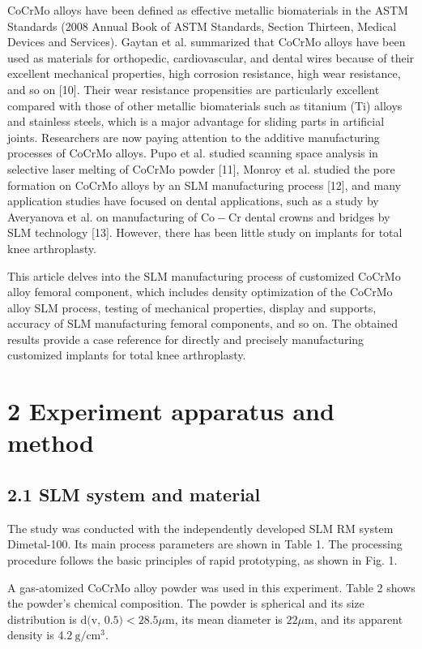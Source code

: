 \documentclass[10pt]{article}
\begin{document}
CoCrMo alloys have been defined as effective metallic biomaterials in the ASTM Standards (2008 Annual Book of ASTM Standards, Section Thirteen, Medical Devices and Services). Gaytan et al. summarized that CoCrMo alloys have been used as materials for orthopedic, cardiovascular, and dental wires because of their excellent mechanical properties, high corrosion resistance, high wear resistance, and so on [10]. Their wear resistance propensities are particularly excellent compared with those of other metallic biomaterials such as titanium (Ti) alloys and stainless steels, which is a major advantage for sliding parts in artificial joints. Researchers are now paying attention to the additive manufacturing processes of CoCrMo alloys. Pupo et al. studied scanning space analysis in selective laser melting of CoCrMo powder [11], Monroy et al. studied the pore formation on CoCrMo alloys by an SLM manufacturing process [12], and many application studies have focused on dental applications, such as a study by Averyanova et al. on manufacturing of $\mathrm{Co}-\mathrm{Cr}$ dental crowns and bridges by SLM technology [13]. However, there has been little study on implants for total knee arthroplasty.

This article delves into the SLM manufacturing process of customized CoCrMo alloy femoral component, which includes density optimization of the CoCrMo alloy SLM process, testing of mechanical properties, display and supports, accuracy of SLM manufacturing femoral components, and so on. The obtained results provide a case reference for directly and precisely manufacturing customized implants for total knee arthroplasty.

\section*{2 Experiment apparatus and method}
\subsection*{2.1 SLM system and material}
The study was conducted with the independently developed SLM RM system Dimetal-100. Its main process parameters are shown in Table 1. The processing procedure follows the basic principles of rapid prototyping, as shown in Fig. 1.

A gas-atomized CoCrMo alloy powder was used in this experiment. Table 2 shows the powder's chemical composition. The powder is spherical and its size distribution is $\mathrm{d}(\mathrm{v}$, $0.5)<28.5 \mu \mathrm{m}$, its mean diameter is $22 \mu \mathrm{m}$, and its apparent density is $4.2 \mathrm{~g} / \mathrm{cm}^{3}$.
\end{document}
